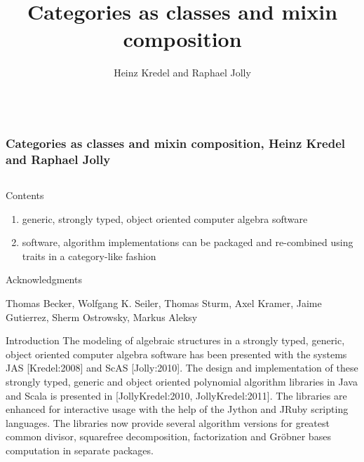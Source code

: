 \documentclass[final]{beamer}
\title[Categories and Mixins]{Categories as classes and mixin composition}
\author[Kredel \& Jolly]{Heinz Kredel\inst{1} and Raphael Jolly\inst{2}}
\institute{IT-Center, University of Mannheim, Germany %
\and Databeans, Paris, France%
}
\begin{document}

\begin{frame}[fragile] 
\frametitle{\mbox{ }\\ \hspace{13cm}Categories as classes and mixin composition, Heinz Kredel and Raphael Jolly}
\begin{columns}[t]

\begin{column}{.3\linewidth}

  \begin{block}{\large Contents}
  \normalsize 
  \begin{enumerate}
  \item generic, strongly typed, object oriented computer algebra software
  \item software, algorithm implementations can be packaged and
    re-combined using traits in a category-like fashion
  \end{enumerate}
{\scriptsize Acknowledgments}\par
{\tiny Thomas Becker, Wolfgang K. Seiler, Thomas Sturm, Axel Kramer, 
Jaime Gutierrez, Sherm Ostrowsky, Markus Aleksy\par}
  \end{block}
  \hfill
  \begin{block}{\large Introduction}
\scriptsize
The modeling of algebraic structures in a strongly typed, generic,
object oriented computer algebra software has been presented with the
systems JAS [Kredel:2008] and ScAS [Jolly:2010].
The design and implementation of these strongly typed, generic and
object oriented polynomial algorithm libraries in Java and Scala is
presented in [JollyKredel:2010, JollyKredel:2011].
The libraries are enhanced for interactive usage with the help of the Jython and
JRuby scripting languages. The libraries now
provide several algorithm versions for greatest common divisor,
squarefree decomposition, factorization and Gr\"obner bases
computation in separate packages.


\end{block}
\end{column}
\end{columns}
\end{frame}
\end{document}
